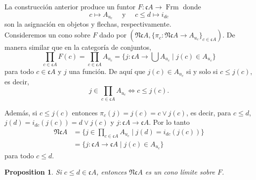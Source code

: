 \documentclass[11pt]{amsart}
\DeclareMathOperator{\Frm}{Frm}
\theoremstyle{plain}
\newtheorem{prop}[thm]{Proposition}
\theoremstyle{definition}
\begin{document}
La construcción anterior produce un funtor $F\colon \mathfrak{c}A\to \Frm$ donde 
\[
c\mapsto A_{u_c}\quad \mbox{ y }\quad c\leq d\mapsto i_{dc}
\]
son la asignación en objetos y flechas, respectivamente.\\

Consideremos un cono sobre $F$ dado por $(\mathfrak{Nc}A, \{\pi_c\colon \mathfrak{Nc}A\to A_{u_c}\}_{c\in \mathfrak{c}A})$. De manera similar que en la categoría de conjuntos, 
\[
\prod_{c\in \mathfrak{c}A}F(c)=\prod_{c\in \mathfrak{c}A}A_{u_c}=\{j\colon \mathfrak{c}A\to \bigcup A_{u_c}\mid j(c)\in A_{u_c}\}
\]
para todo $c\in \mathfrak{c}A$ y $j$ una función. De aquí que $j(c)\in A_{u_c}$ si y solo si $c\leq j(c)$, es decir, 
\[
j\in \prod_{c\in \mathfrak{c}A}A_{u_c} \Leftrightarrow c\leq j(c).
\]

Además, si $c\leq j(c)$ entonces $\pi_c(j)=j(c)=c\vee j(c)$, es decir, para $c\leq d$, $j(d)=i_{dc}(j(c))=d\vee j(c)$ y $j\colon \mathfrak{c}A\to \mathfrak{c}A$. Por lo tanto
\begin{equation}\label{compatibilidad}
\begin{split}
\mathfrak{Nc}A&=\{j\in \prod_{c\in \mathfrak{c}A}A_{u_c}\mid j(d)=i_{dc}(j(c))\}\\
&=\{j\colon \mathfrak{c}A\to \mathfrak{c}A\mid j(c)\in A_{u_c}\}
\end{split}
\end{equation}
para todo $c\leq d$. 

\begin{prop}\label{Flimite}
    Si $c\leq d\in \mathfrak{c}A$, entonces $\mathfrak{Nc}A$ es un cono límite sobre $F$.
\end{prop}
\end{document}
